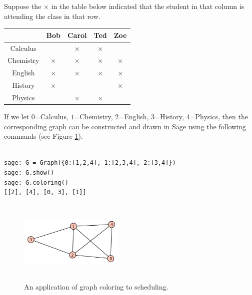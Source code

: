 \begin{example} 
\label{example:coloring}
Suppose the $\times$ in the table below
indicated that the student in that column is attending the class in that
row.

\begin{center}
\begin{tabular}{c|cccc}
                  &  Bob            &  Carol         &       Ted      &    Zoe   \\ \hline
Calculus          &                 &    $\times$   &  $\times$      &           \\
Chemistry        &    $\times$     &   $\times$   &    $\times$   &    $\times$   \\
English            &    $\times$     &   $\times$   &    $\times$   &    $\times$   \\
History          &    $\times$     &              &             &    $\times$     \\
Physics          &                    &    $\times$  &    $\times$    &    \\  \hline

\end{tabular}
\end{center}

If we let $0$=Calculus, $1$=Chemistry, $2$=English,
$3$=History, $4$=Physics, then the corresponding graph can be
constructed and drawn in Sage using the following commands
(see Figure \ref{fig:graph-coloring-scheduling}).

\begin{verbatim}

sage: G = Graph({0:[1,2,4], 1:[2,3,4], 2:[3,4]})
sage: G.show()
sage: G.coloring()
[[2], [4], [0, 3], [1]]

\end{verbatim}


\begin{figure}[h!]
\begin{center}
\includegraphics[height=4cm,width=5cm]{image/graph-coloring/graph-coloring-scheduling}
\end{center}
\caption{An application of graph coloring to scheduling.}
\label{fig:graph-coloring-scheduling}
\end{figure}
\end{example}


